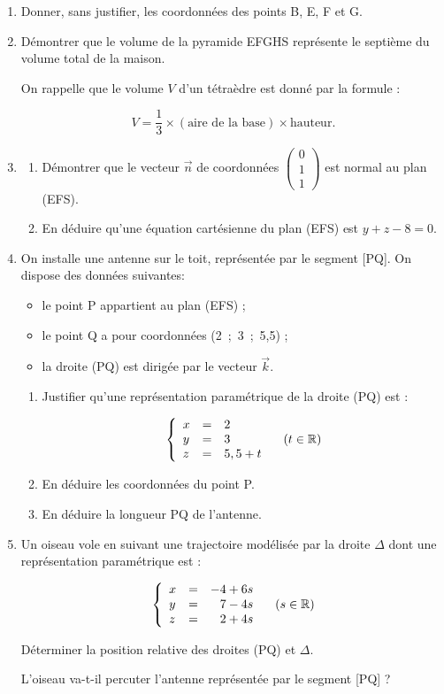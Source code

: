 \documentclass[10pt]{article}
\providecommand{\R}{\mathbb{R}}
\providecommand{\vect}[1]{\overrightarrow{#1}}
\begin{document}
\medskip

\begin{enumerate}
\item Donner, sans justifier, les coordonnées des points B, E, F et G.
\item Démontrer que le volume de la pyramide EFGHS représente le septième du volume total de la maison.

On rappelle que le volume $V$ d'un tétraèdre est donné par la formule :

\[V = \dfrac13 \times (\text{aire de la base}) \times  \text{hauteur}.\]
\item 
	\begin{enumerate}
		\item Démontrer que le vecteur $\vect{n}$ de coordonnées $\begin{pmatrix}0\\1\\1\end{pmatrix}$ est normal au plan (EFS).
		\item En déduire qu'une équation cartésienne du plan (EFS) est $y + z - 8 = 0$.
	\end{enumerate}	
\item On installe une antenne sur le toit, représentée par le segment [PQ]. On dispose des données suivantes:

\begin{itemize}
\item[$\bullet~~$] le point P appartient au plan (EFS) ;
\item[$\bullet~~$] le point Q a pour coordonnées (2~;~3~;~5,5) ;
\item[$\bullet~~$] la droite (PQ) est dirigée par le vecteur $\vect{k}$.
\end{itemize}
	\begin{enumerate}
		\item Justifier qu'une représentation paramétrique de la droite (PQ) est :

\[\left\{\begin{array}{l c l}
x &=&2\\
y &=&3\\
z &=& 5,5 + t
\end{array}\right. \quad (t \in \R)\]
		\item En déduire les coordonnées du point P.
		\item En déduire la longueur PQ de l'antenne.
	\end{enumerate}	
\item Un oiseau vole en suivant une trajectoire modélisée par la droite $\Delta$ dont une représentation paramétrique est :

\[\left\{\begin{array}{l c r}
x & =& -4 +6s\\ y &=& 7 - 4s\\z &=& 2 + 4s
\end{array}\right.\quad (s \in \R)\]

Déterminer la position relative des droites (PQ) et $\Delta$.

L'oiseau va-t-il percuter l'antenne représentée par le segment [PQ] ?

\end{enumerate}

\bigskip
\end{document}
